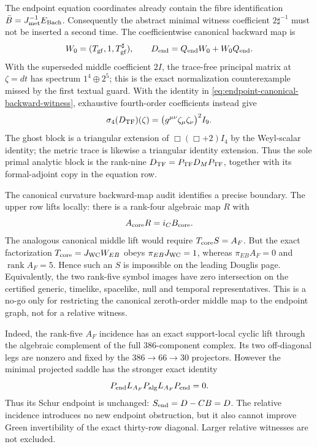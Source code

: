 \documentclass[11pt]{article}
\theoremstyle{definition}
\theoremstyle{remark}
\newcommand{\rank}{\operatorname{rank}}
\begin{document}
The endpoint equation coordinates already contain the fibre identification
$\bar B=J_{\rm met}^{-1}E_{\rm Bach}$.  Consequently the abstract minimal
witness coefficient $2\sharp^{-1}$ must not be inserted a second time.  The
coefficientwise canonical backward map is
\begin{equation}\label{eq:endpoint-canonical-backward-witness}
 W_0=(T_{\rm gf},1,T_{\rm gf}^{\sharp}),
 \qquad
 D_{\rm end}=Q_{\rm end}W_0+W_0Q_{\rm end}.
\end{equation}
With the superseded middle coefficient $2I$, the trace-free principal matrix
at $\zeta=dt$ has spectrum $1^4\oplus2^5$; this is the exact normalization
counterexample missed by the first textual guard.  With the identity in
\eqref{eq:endpoint-canonical-backward-witness}, exhaustive fourth-order
coefficients instead give
\begin{equation}\label{eq:endpoint-scalar-tracefree-symbol}
 \sigma_4(D_{\rm TF})(\zeta)
 =\bigl(g^{\mu\nu}\zeta_\mu\zeta_\nu\bigr)^2I_9.
\end{equation}
The ghost block is a triangular extension of
$\Box(\Box+2)I_4$ by the Weyl-scalar identity; the metric trace is likewise a
triangular identity extension.  Thus the sole primal analytic block is the
rank-nine $D_{\rm TF}=P_{\rm TF}D_MP_{\rm TF}$, together with its formal-adjoint
copy in the equation row.

The canonical curvature backward-map audit identifies a precise boundary.
The upper row lifts locally: there is a rank-four algebraic map $R$ with
\begin{equation}
 A_{\rm core}R=i_C B_{\rm core}.
\end{equation}
The analogous canonical middle lift would require
$T_{\rm core}S=A_F$.  But the exact factorization
$T_{\rm core}=J_{\rm WC}W_{EB}$ obeys
$\pi_{EB}J_{\rm WC}=1$, whereas $\pi_{EB}A_F=0$ and
$\rank A_F=5$.  Hence such an $S$ is impossible on the leading Douglis
page.  Equivalently, the two rank-five symbol images have zero intersection
on the certified generic, timelike, spacelike, null and temporal
representatives.  This is a no-go only for restricting the canonical
zeroth-order middle map to the endpoint graph, not for a relative witness.

Indeed, the rank-five $A_F$ incidence has an exact support-local cyclic lift
through the algebraic complement of the full $386$-component complex.  Its
two off-diagonal legs are nonzero and fixed by the $386\to66\to30$
projectors.  However the minimal projected saddle has the stronger exact
identity
\begin{equation}\label{eq:endpoint-minimal-saddle-nilpotence}
 P_{\rm end}L_{A_F}P_{\rm alg}L_{A_F}P_{\rm end}=0.
\end{equation}
Thus its Schur endpoint is unchanged: $S_{\rm end}=D-CB=D$.  The relative
incidence introduces no new endpoint obstruction, but it also cannot improve
Green invertibility of the exact thirty-row diagonal.  Larger relative
witnesses are not excluded.
\end{document}
